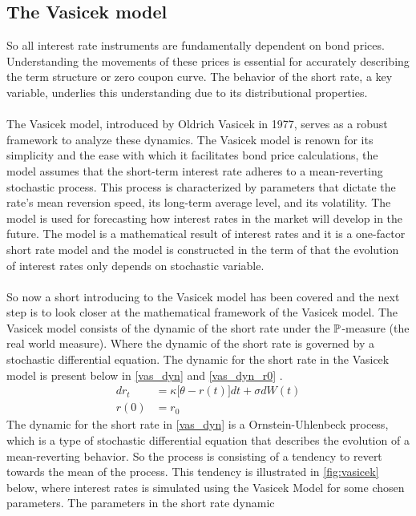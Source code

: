 \subsection{The Vasicek model}
So all interest rate instruments are fundamentally dependent on bond prices. Understanding the movements of 
these prices is essential for accurately describing the term structure or zero coupon curve. The behavior 
of the short rate, a key variable, underlies this understanding due to its distributional properties.
\\\\
The Vasicek model, introduced by Oldrich Vasicek in 1977, serves as a robust framework to analyze these dynamics.
The Vasicek model is renown for its simplicity and the ease with which it facilitates bond price calculations, 
the model assumes that the short-term interest rate adheres to a mean-reverting stochastic process. This process is characterized 
by parameters that dictate the rate's mean reversion speed, its long-term average level, and its volatility.
The model is used for forecasting how interest rates in the market will develop in the future. The model is a
mathematical result of interest rates and it is a one-factor short rate model and the model is constructed in the 
term of that the evolution of interest rates only depends on stochastic variable.
\\\\
So now a short introducing to the Vasicek model has been covered and the next step is to look closer at the 
mathematical framework of the Vasicek model. The Vasicek model consists of the dynamic of the short rate under the $\mathbb{P}$-measure
(the real world measure). Where the dynamic of the short rate is governed by a stochastic differential equation. 
The dynamic for the short rate in the Vasicek model is present below in \autoref{vas_dyn} and \autoref{vas_dyn_r0} \cite{Bjork}.
\begin{align}
    d r_t &= \kappa \Big[\theta -r(t)\Big] dt + \sigma d W(t) \label{vas_dyn}\\
    r(0) &= r_0 \label{vas_dyn_r0}
\end{align}
The dynamic for the short rate in \autoref{vas_dyn} is a Ornstein-Uhlenbeck process, which is a type of stochastic 
differential equation that describes the evolution of a mean-reverting behavior. So the process is consisting of a 
tendency to revert towards the mean of the process. This tendency is illustrated in \autoref{fig:vasicek} below, where 
interest rates is simulated using the Vasicek Model for some chosen parameters. The parameters in the short rate dynamic

